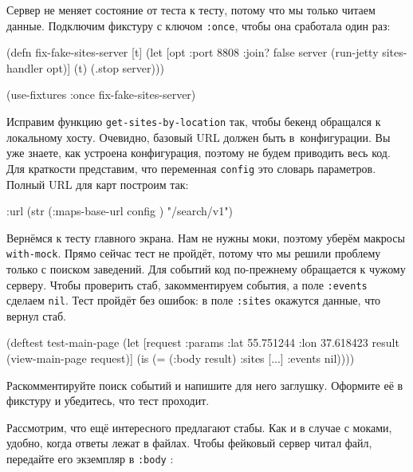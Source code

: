 Сервер не меняет состояние от теста к тесту, потому что мы только читаем
данные. Подключим фикстуру с ключом \verb|:once|, чтобы она сработала один
раз:

\begin{english}
  \begin{clojure}
(defn fix-fake-sites-server [t]
  (let [opt {:port 8808 :join? false}
        server (run-jetty sites-handler opt)]
    (t)
    (.stop server)))

(use-fixtures :once fix-fake-sites-server)
  \end{clojure}
\end{english}


Исправим функцию \verb|get-sites-by-location| так, чтобы бекенд обращался к
локальному хосту. Очевидно, базовый URL должен быть в~конфигурации. Вы уже
знаете, как устроена конфигурация, поэтому не будем приводить весь код. Для
краткости представим, что переменная \verb|config| это словарь
параметров. Полный URL для карт построим так:

\begin{english}
  \begin{clojure}
{:url (str (:maps-base-url config ) "/search/v1")}
  \end{clojure}
\end{english}

Вернёмся к тесту главного экрана. Нам не нужны моки, поэтому уберём макросы
\verb|with-mock|. Прямо сейчас тест не пройдёт, потому что мы решили проблему
только с поиском заведений. Для событий код по-прежнему обращается к чужому
серверу. Чтобы проверить стаб, закомментируем события, а поле \verb|:events|
сделаем \verb|nil|. Тест пройдёт без ошибок: в поле \verb|:sites| окажутся
данные, что вернул стаб.

\begin{english}
  \begin{clojure}
(deftest test-main-page
  (let [request {:params {:lat 55.751244
                          :lon 37.618423}}
        result (view-main-page request)]
    (is (= (:body result) {:sites [...] :events nil}))))
  \end{clojure}
\end{english}

Раскомментируйте поиск событий и напишите для него заглушку. Оформите её в
фикстуру и убедитесь, что тест проходит.

Рассмотрим, что ещё интересного предлагают стабы. Как и в случае с моками,
удобно, когда ответы лежат в файлах. Чтобы фейковый сервер читал файл, передайте
его экземпляр в \verb|:body| :

